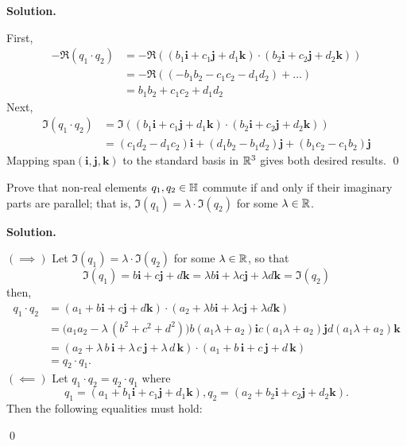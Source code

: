 \documentclass[12pt]{book}
\theoremstyle{definition}
\newenvironment{solution}
{%
  \par\noindent\textbf{Solution.}\quad
}
{%
  \qed\par
}
\begin{document}
\begin{solution}
  First,
  \[
  \begin{aligned}
    -\Re (q_1 \cdot q_2) &= -\Re ((b_1\mathbf{i} + c_1\mathbf{j} + d_1\mathbf{k}) \cdot (b_2\mathbf{i} + c_2\mathbf{j} + d_2\mathbf{k})) \\
                         &= -\Re((- b_1b_2 - c_1c_2 - d_1d_2) + \dots) \\
                         &= b_1b_2 + c_1c_2 + d_1d_2
  \end{aligned}
  \]
  Next, 
  \[
  \begin{aligned}
    \Im (q_1 \cdot q_2) &= \Im ((b_1\mathbf{i} + c_1\mathbf{j} + d_1\mathbf{k}) \cdot (b_2\mathbf{i} + c_2\mathbf{j} + d_2\mathbf{k})) \\
                        &= (c_1d_2 - d_1c_2)\mathbf{i} + (d_1b_2 - b_1d_2)\mathbf{j} + (b_1c_2 - c_1b_2)\mathbf{j}
  \end{aligned}
  \]
  Mapping $\text{span}(\mathbf{i},\mathbf{j},\mathbf{k})$ to the standard basis in $\mathbb{R}^3$ gives both desired results.
\end{solution}

\begin{taggedexercise}[\textcolor{yellow}{WIP}]
  Prove that non-real elements $q_1, q_2 \in \mathbb{H}$ commute if and only if their imaginary parts are parallel; that is, $\Im(q_1) = \lambda \cdot \Im(q_2)$ for some $\lambda \in \mathbb{R}$.
\end{taggedexercise}

\begin{solution}
  $(\implies)$ Let $\Im(q_1) = \lambda \cdot \Im(q_2)$ for some $\lambda \in \mathbb{R}$, so that
  \[
    \Im(q_1) = b\mathbf{i} + c\mathbf{j} + d\mathbf{k} = \lambda b\mathbf{i} + \lambda c\mathbf{j} + \lambda d\mathbf{k} = \Im(q_2)
  \]
  then,
  \[
  \begin{aligned}
    q_1 \cdot q_2 &= (a_1 + b\mathbf{i} + c\mathbf{j} + d\mathbf{k})\cdot (a_2 + \lambda b\mathbf{i} + \lambda c\mathbf{j} + \lambda d \mathbf{k}) 
    \\
    &=
    \bigl(a_1 a_2 - \lambda\,(b^2 + c^2 + d^2)\bigr)
    b(a_1 \lambda + a_2)\mathbf{i}
    c(a_1 \lambda + a_2)\mathbf{j}
    d(a_1 \lambda + a_2)\mathbf{k} \\
    &= 
    (a_2 + \lambda\,b\,\mathbf{i} + \lambda\,c\,\mathbf{j} + \lambda\,d\,\mathbf{k}) 
    \cdot (a_1 + b\,\mathbf{i} + c\,\mathbf{j} + d\,\mathbf{k}) \\
    &= q_2 \cdot q_1.
    \end{aligned}
  \]
  $(\impliedby)$ Let $q_1 \cdot q_2 = q_2 \cdot q_1$ where
  \[
    q_1 = (a_1 + b_1\mathbf{i} + c_1\mathbf{j} + d_1\mathbf{k}), q_2 = (a_2 + b_2\mathbf{i} + c_2\mathbf{j} + d_2\mathbf{k}).
  \]
  Then the following equalities must hold:

\end{solution}
\end{document}
